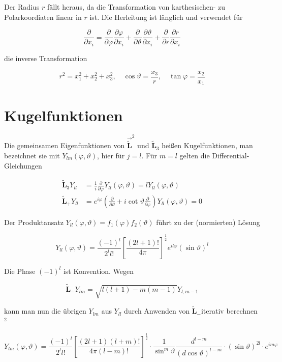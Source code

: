 \documentclass[10pt, letterpaper]{article}
\begin{document}
Der Radius $r$ fällt heraus, da die Transformation von karthesischen- zu Polarkoordiaten linear in $r$ ist. Die Herleitung ist länglich und verwendet für

$$
\frac{\partial}{\partial x_{i}}=\frac{\partial}{\partial \varphi} \frac{\partial \varphi}{\partial x_{i}}+\frac{\partial}{\partial \vartheta} \frac{\partial \vartheta}{\partial x_{i}}+\frac{\partial}{\partial r} \frac{\partial r}{\partial x_{i}}
$$

die inverse Transformation

$$
r^{2}=x_{1}^{2}+x_{2}^{2}+x_{3}^{2}, \quad \cos \vartheta=\frac{x_{3}}{r}, \quad \tan \varphi=\frac{x_{2}}{x_{1}}
$$

\section*{Kugelfunktionen}
Die gemeinsamen Eigenfunktionen von $\overrightarrow{\tilde{\mathbf{L}}}^{2}$ und $\tilde{\mathbf{L}}_{3}$ heißen Kugelfunktionen, man bezeichnet sie mit $Y_{l m}(\varphi, \vartheta)$, hier für $j=l$. Für $m=l$ gelten die Differential-Gleichungen

$$
\begin{aligned}
\tilde{\mathbf{L}}_{3} Y_{l l} & =\frac{1}{i} \frac{\partial}{\partial \varphi} Y_{l l}(\varphi, \vartheta)=l Y_{l l}(\varphi, \vartheta) \\
\tilde{\mathbf{L}}_{+} Y_{l l} & =e^{i \varphi}\left(\frac{\partial}{\partial \vartheta}+i \cot \vartheta \frac{\partial}{\partial \varphi}\right) Y_{l l}(\varphi, \vartheta)=0
\end{aligned}
$$

Der Produktansatz $Y_{l l}(\varphi, \vartheta)=f_{1}(\varphi) f_{2}(\vartheta)$ führt zu der (normierten) Lösung

$$
Y_{l l}(\varphi, \vartheta)=\frac{(-1)^{l}}{2^{l} l!}\left[\frac{(2 l+1)!}{4 \pi}\right]^{\frac{1}{2}} e^{i l \varphi}(\sin \vartheta)^{l}
$$

Die Phase $(-1)^{l}$ ist Konvention. Wegen

$$
\tilde{\mathbf{L}}_{-} Y_{l m}=\sqrt{l(l+1)-m(m-1)} Y_{l, m-1}
$$

kann man nun die übrigen $Y_{l m}$ aus $Y_{l l}$ durch Anwenden von $\tilde{\mathbf{L}}_{-}$iterativ berechnen ${ }^{2}$

$$
Y_{l m}(\varphi, \vartheta)=\frac{(-1)^{l}}{2^{l} l!}\left[\frac{(2 l+1)(l+m)!}{4 \pi(l-m)!}\right]^{\frac{1}{2}} \cdot \frac{1}{\sin ^{m} \vartheta} \frac{d^{l-m}}{(d \cos \vartheta)^{l-m}} \cdot(\sin \vartheta)^{2 l} \cdot e^{i m \varphi}
$$
\end{document}
